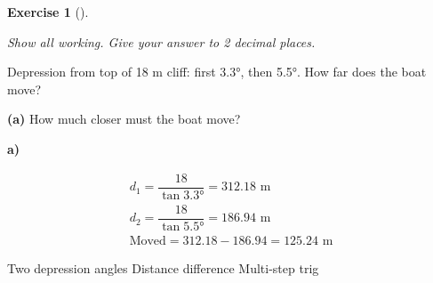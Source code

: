 \documentclass[
  letterpaper,
  DIV=11,
  numbers=noendperiod]{scrreprt}
\theoremstyle{definition}
\newtheorem{exercise}{Exercise}[chapter]
\theoremstyle{remark}
\begin{document}
\begin{exercise}[]\protect\hypertarget{exr-trig-33}{}\label{exr-trig-33}

\emph{Show all working. Give your answer to 2 decimal places.}

Depression from top of 18 m cliff: first 3.3°, then 5.5°. How far does
the boat move?

\textbf{(a)} How much closer must the boat move?

\begin{tcolorbox}[enhanced jigsaw, opacitybacktitle=0.6, coltitle=black, arc=.35mm, colframe=quarto-callout-tip-color-frame, colback=white, bottomrule=.15mm, left=2mm, colbacktitle=quarto-callout-tip-color!10!white, titlerule=0mm, opacityback=0, title=\textcolor{quarto-callout-tip-color}{\faLightbulb}\hspace{0.5em}{🔍 View Solution}, leftrule=.75mm, breakable, rightrule=.15mm, bottomtitle=1mm, toptitle=1mm, toprule=.15mm]

\textbf{a)}

\[
\begin{aligned}
d_1 = \dfrac{18}{\tan 3.3°} = 312.18 \text{ m} \\ d_2 = \dfrac{18}{\tan 5.5°} = 186.94 \text{ m} \\ \text{Moved} = 312.18 - 186.94 = 125.24 \text{ m}
\end{aligned}
\]

\end{tcolorbox}

{Two depression angles} {Distance difference} {Multi-step trig}

\end{exercise}
\end{document}
